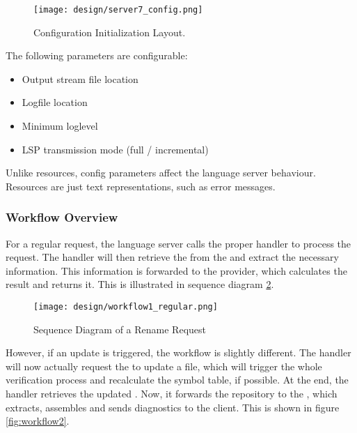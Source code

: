 \begin{figure}[H]
    \centering
    \texttt{[image: design/server7\_config.png]}
    \caption{Configuration Initialization Layout.}
    \label{fig:server_config}
\end{figure}

The following parameters are configurable:
\begin{itemize}
    \item Output stream file location
    \item Logfile location
    \item Minimum loglevel
    \item LSP transmission mode (full / incremental)
\end{itemize}
Unlike resources, config parameters affect the language server behaviour.
Resources are just text representations, such as error messages.


\subsubsection{Workflow Overview}
For a regular request, the language server calls the proper handler to process the request.
The handler will then retrieve the  from the  and extract the necessary information.
This information is forwarded to the provider, which calculates the result and returns it.
This is illustrated in sequence diagram \ref{fig:workflow1}.

\begin{figure}[H]
    \centering
    \texttt{[image: design/workflow1\_regular.png]}
    \caption{Sequence Diagram of a Rename Request}
    \label{fig:workflow1}
\end{figure}

However, if an update is triggered, the workflow is slightly different.
The handler will now actually request the  to update a file, which will trigger the whole verification process and recalculate the symbol table, if possible.
At the end, the handler retrieves the updated .
Now, it forwards the repository to the , which extracts, assembles and sends diagnostics to the client.
This is shown in figure \ref{fig:workflow2}.


